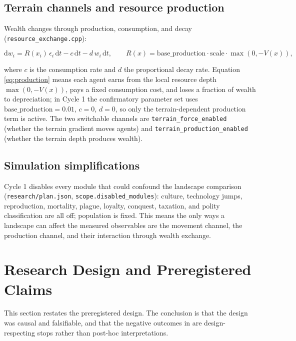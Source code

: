 \documentclass[11pt,a4paper]{article}
\newcommand{\code}[1]{\texttt{#1}}
\begin{document}
\subsection{Terrain channels and resource production}

Wealth changes through production, consumption, and decay
(\code{resource\_exchange.cpp}):

\begin{equation}
\mathrm{d}w_i = R(x_i)\,\epsilon_i\,\mathrm{d}t - c\,\mathrm{d}t - d\,w_i\,\mathrm{d}t,
\qquad
R(x)=\mathrm{base\_production}\cdot\mathrm{scale}\cdot\max(0,-V(x)),
\label{eq:production}
\end{equation}

where $c$ is the consumption rate and $d$ the proportional decay rate. Equation
\eqref{eq:production} means each agent earns from the local resource depth
$\max(0,-V(x))$, pays a fixed consumption cost, and loses a fraction of wealth
to depreciation; in Cycle 1 the confirmatory parameter set uses
$\mathrm{base\_production}=0.01$, $c=0$, $d=0$, so only the terrain-dependent
production term is active. The two switchable channels are
\code{terrain\_force\_enabled} (whether the terrain gradient moves agents) and
\code{terrain\_production\_enabled} (whether the terrain depth produces
wealth).

\subsection{Simulation simplifications}

Cycle 1 disables every module that could confound the landscape comparison
(\code{research/plan.json}, \code{scope.disabled\_modules}): culture,
technology jumps, reproduction, mortality, plague, loyalty, conquest, taxation,
and polity classification are all off; population is fixed. This means the only
ways a landscape can affect the measured observables are the movement channel,
the production channel, and their interaction through wealth exchange.

\section{Research Design and Preregistered Claims}
\label{sec:design}

This section restates the preregistered design. The conclusion is that the
design was causal and falsifiable, and that the negative outcomes in
 are design-respecting stops rather than post-hoc
interpretations.
\end{document}
